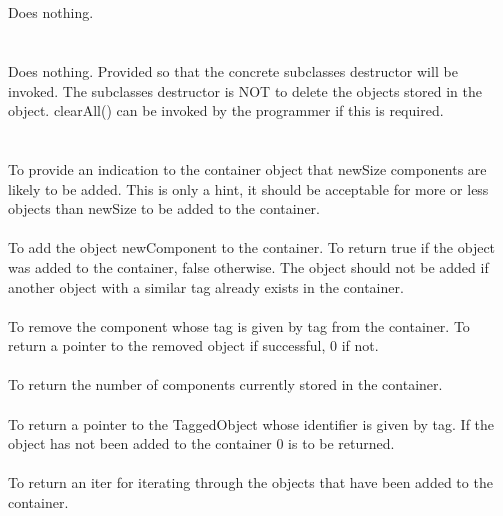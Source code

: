  \\
 \\
Does nothing.\\

 \\
 \\ 
Does nothing. Provided so that the concrete subclasses destructor will
be invoked. The subclasses destructor is NOT to delete the objects
stored in the object. clearAll() can be invoked by the
programmer if this is required. \\

 \\
\\
To provide an indication to the container object that \p newSize
components are likely to be added. This is only a hint, it should be
acceptable for more or less objects than \p newSize to be added to
the container. \\

\\
To add the object \p newComponent to the container. To return
\p true if the object was added to the container, \p false
otherwise. The object should not be added if another object with a
similar tag already exists in the container.\\
 
\\
To remove the component whose tag is given by \p tag from the
container. To return a pointer to the removed object if successful,
$0$ if not.\\ 

\\
To return the number of components currently stored in the container. \\

\\
To return a pointer to the TaggedObject whose identifier is given by
\p tag. If the object has not been added to the container $0$ is to
be returned. \\

\\
To return an iter for iterating through the objects that have been
added to the container. \\

